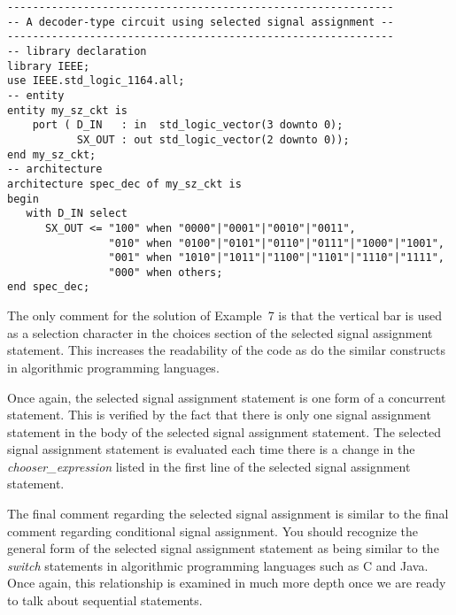 \noindent
\begin{minipage}{0.99\linewidth}
\begin{lstlisting}[label=example_7, caption=Solution of Example~7.]
-------------------------------------------------------------
-- A decoder-type circuit using selected signal assignment --
-------------------------------------------------------------
-- library declaration
library IEEE;
use IEEE.std_logic_1164.all;
-- entity
entity my_sz_ckt is
    port ( D_IN   : in  std_logic_vector(3 downto 0);
           SX_OUT : out std_logic_vector(2 downto 0)); 
end my_sz_ckt;
-- architecture
architecture spec_dec of my_sz_ckt is
begin
   with D_IN select
      SX_OUT <= "100" when "0000"|"0001"|"0010"|"0011", 
                "010" when "0100"|"0101"|"0110"|"0111"|"1000"|"1001", 
                "001" when "1010"|"1011"|"1100"|"1101"|"1110"|"1111", 
                "000" when others;  
end spec_dec;
\end{lstlisting}
\end{minipage}

The only comment for the solution of Example~7 is that the vertical bar is used as a selection character in the choices section of the selected signal assignment statement. This increases the readability of the code as do the similar constructs in algorithmic programming languages.

Once again, the selected signal assignment statement is one form of a concurrent statement. This is verified by the fact that there is only one signal assignment statement in the body of the selected signal assignment statement. The selected signal assignment statement is evaluated each time there is a change in the \textit{chooser\_expression} listed in the first line of the selected signal assignment statement.

The final comment regarding the selected signal assignment is similar to the final comment regarding conditional signal assignment. You should recognize the general form of the selected signal assignment statement as being similar to the \textit{switch} statements in algorithmic programming languages such as C and Java. Once again, this relationship is examined in much more depth once we are ready to talk about sequential statements.

